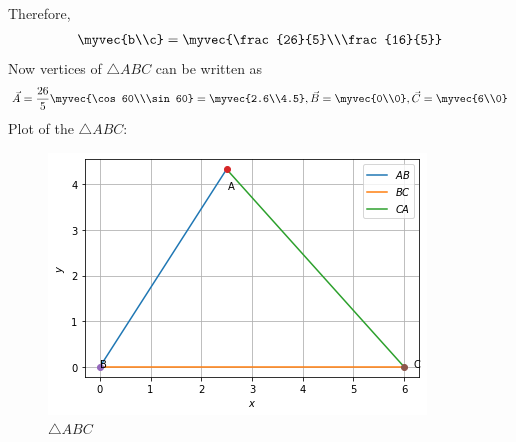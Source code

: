\documentclass[journal,12pt,twocolumn]{IEEEtran}
\begin{document}
Therefore,
\begin{align}
    \myvec{b\\c}=\myvec{\frac{26}{5}\\\frac{16}{5}}
\end{align}
Now vertices of $\triangle ABC$ can be written as
\begin{align}
    \vec{A}=\frac{26}{5}\myvec{\cos60\\\sin60}=\myvec{2.6\\4.5} ,\vec{B}=\myvec{0\\0},\vec{C}=\myvec{6\\0}
\end{align}
Plot of the  $\triangle ABC$:
\begin{figure}[ht]
    \centering
    \includegraphics[width=\columnwidth]{fig-1.png}
    \caption{$\triangle ABC$}
    \label{fig:$\triangle ABC$}
\end{figure}
\end{document}
